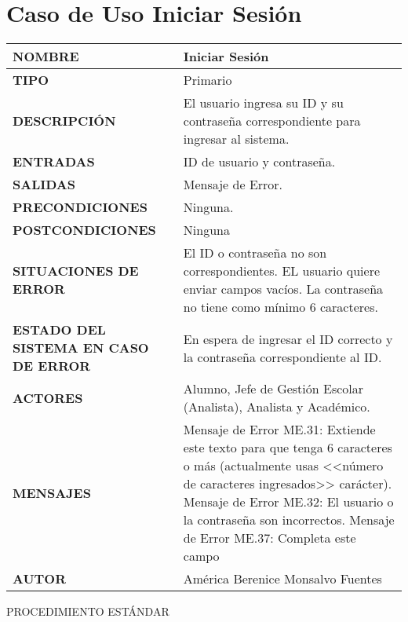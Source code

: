 \newpage
\section{Caso de Uso Iniciar Sesión}
\begin{longtable}{ | p{6cm} | p{10cm} |}
	\hline
	\textbf{NOMBRE} & Iniciar Sesión\\
	\hline
	\textbf{TIPO} & Primario\\
	\hline
	\textbf{DESCRIPCIÓN} & El usuario ingresa su ID y su contraseña correspondiente para ingresar al sistema.\\
	\hline
	\textbf{ENTRADAS} & ID de usuario y contraseña.\\
	\hline
	\textbf{SALIDAS} & Mensaje de Error.\\
	\hline
	\textbf{PRECONDICIONES} & Ninguna.\\
	\hline
	\textbf{POSTCONDICIONES} & Ninguna\\
	\hline
	\textbf{SITUACIONES DE ERROR} 
	&
	El ID o contraseña no son correspondientes.\newline
	EL usuario quiere enviar campos vacíos.\newline
	La contraseña no tiene como mínimo 6 caracteres.\\
	\hline
	\textbf{ESTADO DEL SISTEMA EN CASO DE ERROR} & En espera de ingresar el ID correcto y la contraseña correspondiente al ID.\\
	\hline
	\textbf{ACTORES} & Alumno, Jefe de Gestión Escolar (Analista), Analista y Académico.\\
	\hline
	\textbf{MENSAJES} 
	&
	Mensaje de Error ME.31: Extiende este texto para que tenga 6 caracteres o más (actualmente usas <<número de caracteres ingresados>> carácter).\newline
	Mensaje de Error ME.32: El usuario o la contraseña son incorrectos.\newline
	Mensaje de Error ME.37: Completa este campo\\
	\hline
	\textbf{AUTOR} & América Berenice Monsalvo Fuentes\\
	\hline
\end{longtable}
\vspace*{1cm}
\noindent
\Large{PROCEDIMIENTO ESTÁNDAR}
\large{}
